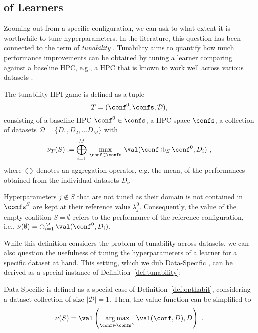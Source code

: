 \subsection{\tunability of Learners}\label{sec:tunability}



Zooming out from a specific configuration, we can ask to what extent it is worthwhile to tune hyperparameters. In the literature, this question has been connected to the term of \textit{tunability} \citep{tunability}. Tunability aims to quantify how much performance improvements can be obtained by tuning a learner comparing against a baseline HPC, e.g., a HPC that is known to work well across various datasets \citep{DBLP:conf/gecco/PushakH20a}.




\begin{definition}\label{def:ds-tunability}
The tunability HPI game is defined as a tuple 
\[
T = (\conf^0, \confs, \mathcal{D}),
\]
consisting of a baseline HPC $\conf^0 \in \confs$, a HPC space $\confs$, a collection of datasets $\mathcal{D} = \{ D_1, D_2, \ldots D_M \}$ with
\[
\nu_T(S) := \bigoplus_{i=1}^M \, \max_{\conf \in \confs}
\,\val(\conf \oplus_S \conf^0, D_i) \,\, ,
\]
where $\bigoplus$ denotes an aggregation operator, e.g. the mean, of the performances obtained from the individual datasets $D_i$.
\end{definition}
Hyperparameters $j \notin S$ that
are not tuned as their domain is not contained in $\confs^S$ are kept at their reference value $\lambda^0_j$.
Consequently, the value of the empty coalition $S=\emptyset$ refers to the performance of the reference configuration,
i.e., $\nu(\emptyset) = \oplus_{i=1}^M\, \val(\conf^0, D_i)$.


While this definition considers the problem of tunability across datasets, we can also question the usefulness of tuning the hyperparameters of a learner for a specific dataset at hand. This setting, which we dub Data-Specific \tunability, can be derived as a special instance of Definition~\ref{def:tunability}:

\begin{definition}\label{def:ds-tunability}
Data-Specific \tunability is defined as a special case of Definition~\ref{def:opthabit}, considering a dataset collection of size $|\mathcal{D}| = 1$. Then, the value function can be simplified to
\[
\nu(S) = \val \left( \underset{\conf \in \confs^S}{\arg\max} 
\,\val(\conf, D), D  \right) \,\,.
\]
\end{definition}

